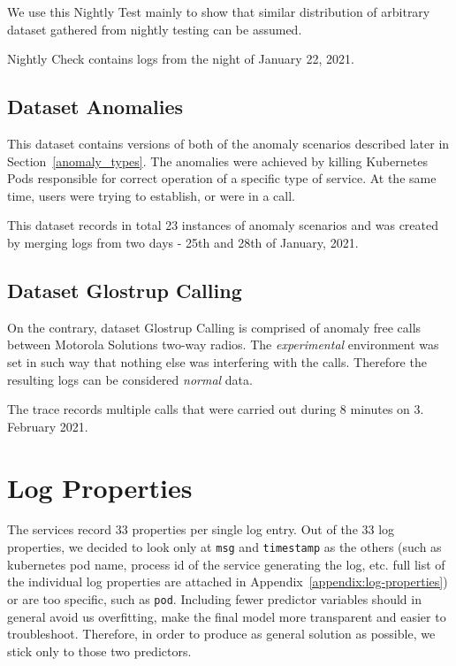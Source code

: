We use this Nightly Test mainly to show that similar distribution of arbitrary dataset gathered from nightly testing can be assumed.

Nightly Check contains logs from the night of January 22, 2021.

\subsection{Dataset Anomalies}

This dataset contains versions of both of the anomaly scenarios described later in Section~\ref{anomaly_types}. 
The anomalies were achieved by killing Kubernetes Pods responsible for correct operation of a specific type of service. 
At the same time, users were trying to establish, or were in a call.

This dataset records in total 23 instances of anomaly scenarios and was created by merging logs from two days - 25th and 28th of January, 2021.

\subsection{Dataset Glostrup Calling}

On the contrary, dataset Glostrup Calling is comprised of anomaly free calls between Motorola Solutions two-way radios. 
The \textit{experimental} environment was set in such way that nothing else was interfering with the calls. Therefore the resulting logs can be considered \textit{normal} data.

The trace records multiple calls that were carried out during 8 minutes on 3. February 2021.

\section{Log Properties}
The services record 33 properties per single log entry. Out of the 33 log properties, we decided to look only at \texttt{msg} and \texttt{timestamp} as the others (such as kubernetes pod name, process id of the service generating the log, etc. full list of the individual log properties are attached in Appendix~\ref{appendix:log-properties}) or are too specific, such as \texttt{pod}.
Including fewer predictor variables should in general avoid us overfitting, make the final model more transparent and easier to troubleshoot.
Therefore, in order to produce as general solution as possible, we stick only to those two predictors.

